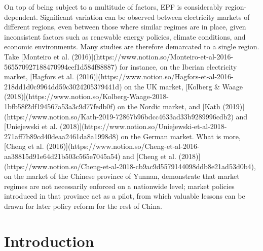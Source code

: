 On top of being subject to a multitude of factors, EPF is considerably region-dependent. Significant variation can be observed between electricity markets of different regions, even between those where similar regimes are in place, given inconsistent factors such as renewable energy policies, climate conditions, and economic environments. Many studies are therefore demarcated to a single region. Take [Monteiro et al. (2016)](https://www.notion.so/Monteiro-et-al-2016-565570927188470994eef1d584f88887) for instance, on the Iberian electricity market, [Hagfors et al. (2016)](https://www.notion.so/Hagfors-et-al-2016-218dd1d0c9964dd59c3024205379441d) on the UK market, [Kolberg \& Waage (2018)](https://www.notion.so/Kolberg-Waage-2018-1bfb58f2df194567a53a3c9d77fedb0f) on the Nordic market, and [Kath (2019)](https://www.notion.so/Kath-2019-72867b96bdcc4633ad33b9289996cdb2) and [Uniejewski et al. (2018)](https://www.notion.so/Uniejewski-et-al-2018-271aff7b89cd40deaa2461da8a1998d8) on the German market. What is more, [Cheng et al. (2016)](https://www.notion.so/Cheng-et-al-2016-aa38815d91e64d21b503c565e7045a54) and [Cheng et al. (2018)](https://www.notion.so/Cheng-et-al-2018-cb9ac9d5579144098ddb8e21ad53d0b4), on the market of the Chinese province of Yunnan, demonstrate that market regimes are not necessarily enforced on a nationwide level; market policies introduced in that province act as a pilot, from which valuable lessons can be drawn for later policy reform for the rest of China.

\section{Introduction}

































